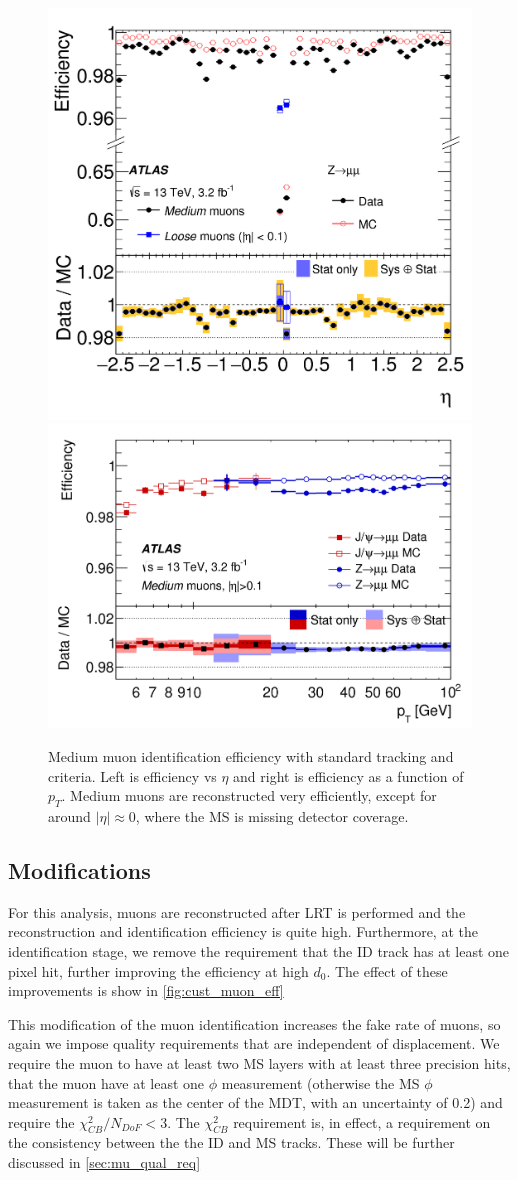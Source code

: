\begin{figure}[htbp]
\centering
\includegraphics[width=.43\textwidth]{figures/EventReconstruction/muon-reco-eta.png}
\includegraphics[width=.52\textwidth]{figures/EventReconstruction/muon-reco-pt.png}
\caption{Medium muon identification efficiency with standard tracking and criteria. Left is efficiency vs $\eta$ and right is efficiency as a function of $p_{T}$. Medium muons are reconstructed very efficiently, except for around $|\eta| \approx 0$, where the \ac{MS} is missing detector coverage.}
\label{fig:std_muon_eff}
\end{figure}


\subsection{Modifications}
\label{sec:mu_reco_mods}

For this analysis, muons are reconstructed after \ac{LRT} is performed and the reconstruction and identification efficiency is quite high. Furthermore, at the identification stage, we remove the requirement that the \ac{ID} track has at least one pixel hit, further improving the efficiency at high $d_{0}$. The effect of these improvements is show in \autoref{fig:cust_muon_eff}


This modification of the muon identification increases the fake rate of muons, so again we impose quality requirements that are independent of displacement. We require the muon to have at least two \ac{MS} layers with at least three precision hits, that the muon have at least one $\phi$ measurement (otherwise the \ac{MS} $\phi$ measurement is taken as the center of the \ac{MDT}, with an uncertainty of 0.2) and require the $\chi^{2}_{CB}/N_{DoF} < 3$. The $\chi^{2}_{CB}$ requirement is, in effect, a requirement on the consistency between the the \ac{ID} and \ac{MS} tracks. These will be further discussed in \autoref{sec:mu_qual_req}


